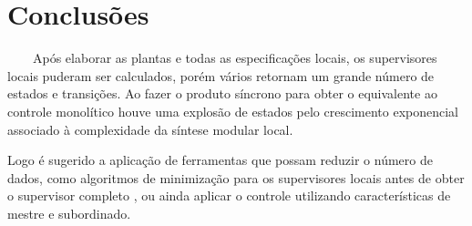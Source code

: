 \section{Conclusões}

~~~~Após elaborar as plantas e todas as especificações locais, os supervisores locais puderam ser calculados, porém vários retornam um grande número de estados e transições. Ao fazer o produto síncrono para obter o equivalente ao controle monolítico houve uma explosão de estados pelo crescimento exponencial associado à complexidade da síntese modular local.

Logo é sugerido a aplicação de ferramentas que possam reduzir o número de dados, como algoritmos de minimização para os supervisores locais antes de obter o supervisor completo \cite{Queiroz}, ou ainda aplicar o controle utilizando características de mestre e subordinado.